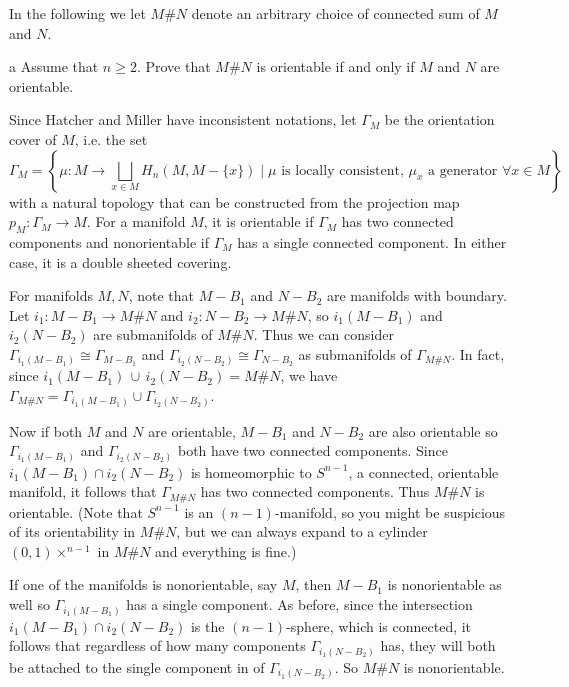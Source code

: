 \documentclass[11pt,letterpaper]{article}
\begin{document}
\begin{solution}
     In the following we let $M\#N$ denote an arbitrary choice of connected sum of $M$ and $N$.
     \begin{partproblem}{a}
         Assume that $n\geq 2$. Prove that $M\# N$ is orientable if and only if $M$ and $N$ are orientable.
     \end{partproblem}

     \quad Since Hatcher and Miller have inconsistent notations, let $\Gamma_M$ be the orientation cover of $M$, i.e. the set
     \[
         \Gamma_M = \left\{\mu : M \to \bigsqcup_{x\in M} H_n(M, M-\{x\}) \mid \mu\text{ is locally consistent, }\mu_x\text{ a generator }\forall x\in M\right\}
     \]
     with a natural topology that can be constructed from the projection map $p_M : \Gamma_M \to M$. For a manifold $M$, it is orientable if $\Gamma_M$ has two connected components and nonorientable if $\Gamma_M$ has a single connected component. In either case, it is a double sheeted covering.

     \quad For manifolds $M, N$, note that $M-B_1$ and $N-B_2$ are manifolds with boundary. Let $i_1 : M-B_1 \to M\# N$ and $i_2 : N- B_2 \to M\# N$, so $i_1(M-B_1)$ and $i_2(N-B_2)$ are submanifolds of $M\# N$. Thus we can consider $\Gamma_{i_1(M-B_1)} \cong \Gamma_{M-B_1}$ and $\Gamma_{i_2(N-B_2)}\cong \Gamma_{N-B_2}$ as submanifolds of $\Gamma_{M\# N}$. In fact, since $i_1(M-B_1)\,\cup\, i_2(N-B_2) = M\# N$, we have $\Gamma_{M\# N} = \Gamma_{i_1(M-B_1)}\cup \Gamma_{i_2(N-B_2)}$. 

    \quad Now if both $M$ and $N$ are orientable, $M-B_1$ and $N-B_2$ are also orientable so $\Gamma_{i_1(M-B_1)}$ and $\Gamma_{i_2(N-B_2)}$ both have two connected components. Since $i_1(M-B_1)\cap i_2(N-B_2)$ is homeomorphic to $S^{n-1}$, a connected, orientable manifold, it follows that $\Gamma_{M\# N}$ has two connected components. Thus $M\# N$ is orientable. (Note that $S^{n-1}$ is an $(n-1)$-manifold, so you might be suspicious of its orientability in $M\# N$, but we can always expand to a cylinder $(0,1)\times ^{n-1}$ in $M\# N$ and everything is fine.)

    \quad If one of the manifolds is nonorientable, say $M$, then $M-B_1$ is nonorientable as well so $\Gamma_{i_1(M-B_1)}$ has a single component. As before, since the intersection $i_1(M-B_1)\cap i_2(N-B_2)$ is the $(n-1)$-sphere, which is connected, it follows that regardless of how many components $\Gamma_{i_1(N-B_2)}$ has, they will both be attached to the single component in of $\Gamma_{i_1(N-B_2)}$. So $M\# N$ is nonorientable.  


\end{solution}
\end{document}

